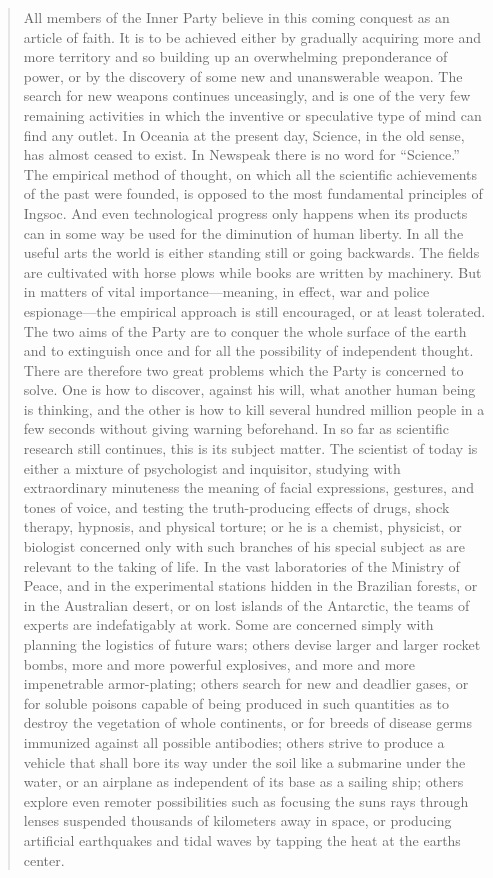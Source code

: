 \begin{paracol}{2}
\begin{quotation}
All members of the Inner Party believe in this coming conquest as an
article of faith. It is to be achieved either by gradually acquiring
more and more territory and so building up an overwhelming preponderance
of power, or by the discovery of some new and unanswerable weapon. The
search for new weapons continues unceasingly, and is one of the very few
remaining activities in which the inventive or speculative type of mind
can find any outlet. In Oceania at the present day, Science, in the old
sense, has almost ceased to exist. In Newspeak there is no word for
``Science.'' The empirical method of thought, on which all the scientific
achievements of the past were founded, is opposed to the most
fundamental principles of Ingsoc. And even technological progress only
happens when its products can in some way be used for the diminution of
human liberty. In all the useful arts the world is either standing still
or going backwards. The fields are cultivated with horse plows while
books are written by machinery. But in matters of vital
importance---meaning, in effect, war and police espionage---the
empirical approach is still encouraged, or at least tolerated. The two
aims of the Party are to conquer the whole surface of the earth and to
extinguish once and for all the possibility of independent thought.
There are therefore two great problems which the Party is concerned to
solve. One is how to discover, against his will, what another human
being is thinking, and the other is how to kill several hundred million
people in a few seconds without giving warning beforehand. In so far as
scientific research still continues, this is its subject matter. The
scientist of today is either a mixture of psychologist and inquisitor,
studying with extraordinary minuteness the meaning of facial
expressions, gestures, and tones of voice, and testing the
truth-producing effects of drugs, shock therapy, hypnosis, and physical
torture; or he is a chemist, physicist, or biologist concerned only with
such branches of his special subject as are relevant to the taking of
life. In the vast laboratories of the Ministry of Peace, and in the
experimental stations hidden in the Brazilian forests, or in the
Australian desert, or on lost islands of the Antarctic, the teams of
experts are indefatigably at work. Some are concerned simply with
planning the logistics of future wars; others devise larger and larger
rocket bombs, more and more powerful explosives, and more and more
impenetrable armor-plating; others search for new and deadlier gases, or
for soluble poisons capable of being produced in such quantities as to
destroy the vegetation of whole continents, or for breeds of disease
germs immunized against all possible antibodies; others strive to
produce a vehicle that shall bore its way under the soil like a
submarine under the water, or an airplane as independent of its base as
a sailing ship; others explore even remoter possibilities such as
focusing the sun\textquotesingle s rays through lenses suspended
thousands of kilometers away in space, or producing artificial
earthquakes and tidal waves by tapping the heat at the
earth\textquotesingle s center.
\end{quotation}


\end{paracol}
